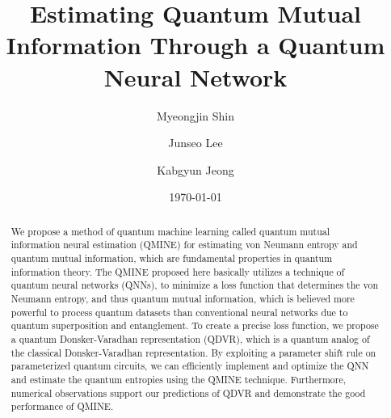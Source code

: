 \documentclass[aps,groupedaddress,superscriptaddress,amssymb,amsmath,amsbsy,amsfonts,twocolumn,pra]{revtex4}
\begin{document}
\newcommand*{\cl}[1]{{\mathcal{#1}}}
\newcommand*{\bb}[1]{{\mathbb{#1}}}
\newcommand{\ket}[1]{|#1\rangle}
\newcommand{\bra}[1]{\langle#1|}
\newcommand{\inn}[2]{\langle#1|#2\rangle}
\newcommand{\proj}[2]{| #1 \rangle\!\langle #2 |}
\newcommand*{\tn}[1]{{\textnormal{#1}}}
\newcommand*{\1}{{\mathbb{1}}}
\newcommand{\T}{\mbox{$\textnormal{Tr}$}}
\newcommand*{\todo}[1]{\textcolor[rgb]{0.99,0.1,0.3}{#1}}

\theoremstyle{plain}
\newtheorem{prop}{Proposition}
\newtheorem{proposition}{Proposition}
\newtheorem{theorem}{Theorem}
\newtheorem{lemma}[theorem]{Lemma}
\newtheorem{remark}{Remark}

\theoremstyle{definition}
\newtheorem{definition}{Definition}

\title{Estimating Quantum Mutual Information Through a Quantum Neural Network}
\author{Myeongjin Shin}

\author{Junseo Lee}

\author{Kabgyun Jeong}


\date{\today}

\begin{abstract}
We propose a method of quantum machine learning called quantum mutual information neural estimation (QMINE) for estimating von Neumann entropy and quantum mutual information, which are fundamental properties in quantum information theory. The QMINE proposed here basically utilizes a technique of quantum neural networks (QNNs), to minimize a loss function that determines the von Neumann entropy, and thus quantum mutual information, which is believed more powerful to process quantum datasets than conventional neural networks due to quantum superposition and entanglement. To create a precise loss function, we propose a quantum Donsker-Varadhan representation (QDVR), which is a quantum analog of the classical Donsker-Varadhan representation. By exploiting a parameter shift rule on parameterized quantum circuits, we can efficiently implement and optimize the QNN and estimate the quantum entropies using the QMINE technique. Furthermore, numerical observations support our predictions of QDVR and demonstrate the good performance of QMINE. 
\end{abstract}
\end{document}
